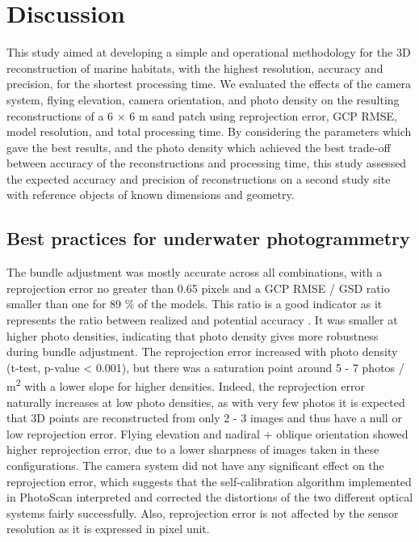 \section[Discussion]{Discussion}\label{chapitre2_4}
This study aimed at developing a simple and operational methodology for the 3D reconstruction of marine habitats, with the highest resolution, accuracy and precision, for the shortest processing time. We evaluated the effects of the camera system, flying elevation, camera orientation, and photo density on the resulting reconstructions of a 6 $\times$ 6 m sand patch using reprojection error, GCP RMSE, model resolution, and total processing time. By considering the parameters which gave the best results, and the photo density which achieved the best trade-off between accuracy of the reconstructions and processing time, this study assessed the expected accuracy and precision of reconstructions on a second study site with reference objects of known dimensions and geometry.

\subsection{Best practices for underwater photogrammetry}\label{chapitre2_4.1}
The bundle adjustment was mostly accurate across all combinations, with a reprojection error no greater than 0.65 pixels and a GCP RMSE / GSD ratio smaller than one for 89 \% of the models. This ratio is a good indicator as it represents the ratio between realized and potential accuracy \citep{forstner_photogrammetric_2016}. It was smaller at higher photo densities, indicating that photo density gives more robustness during bundle adjustment. The reprojection error increased with photo density (t-test, p-value < 0.001), but there was a saturation point around 5 - 7 photos / m\textsuperscript{2} with a lower slope for higher densities. Indeed, the reprojection error naturally increases at low photo densities, as with very few photos it is expected that 3D points are reconstructed from only 2 - 3 images and thus have a null or low reprojection error. Flying elevation and nadiral + oblique orientation showed higher reprojection error, due to a lower sharpness of images taken in these configurations. The camera system did not have any significant effect on the reprojection error, which suggests that the self-calibration algorithm implemented in PhotoScan interpreted and corrected the distortions of the two different optical systems fairly successfully. Also, reprojection error is not affected by the sensor resolution as it is expressed in pixel unit.

